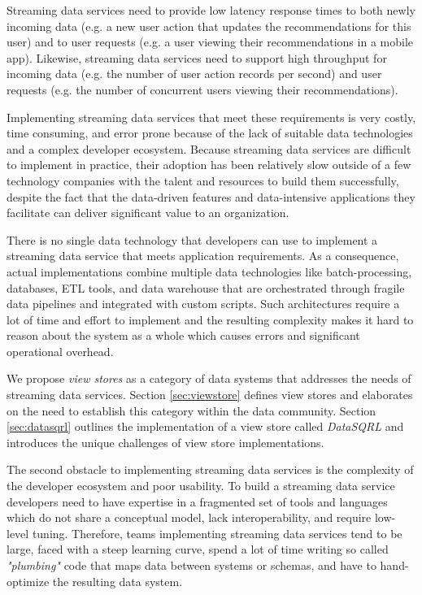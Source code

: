 \documentclass[	DIV=calc,%
							paper=letter,%
							fontsize=11pt,%
							twocolumn]{scrartcl}	 					%
\begin{document}
Streaming data services need to provide low latency response times to both newly incoming data (e.g. a new user action that updates the recommendations for this user) and to user requests (e.g. a user viewing their recommendations in a mobile app). Likewise, streaming data services need to support high throughput for incoming data (e.g. the number of user action records per second) and user requests (e.g. the number of concurrent users viewing their recommendations).

Implementing streaming data services that meet these requirements is very costly, time consuming, and error prone because of the lack of suitable data technologies and a complex developer ecosystem. Because streaming data services are difficult to implement in practice, their adoption has been relatively slow outside of a few technology companies with the talent and resources to build them successfully, despite the fact that the data-driven features and data-intensive applications they facilitate can deliver significant value to an organization.

There is no single data technology that developers can use to implement a streaming data service that meets application requirements. As a consequence, actual implementations combine multiple data technologies like batch-processing, databases, ETL tools, and data warehouse that are orchestrated through fragile data pipelines and integrated with custom scripts. Such architectures require a lot of time and effort to implement and the resulting complexity makes it hard to reason about the system as a whole which causes errors and significant operational overhead.

We propose \emph{view stores} as a category of data systems that addresses the needs of streaming data services. Section \ref{sec:viewstore} defines view stores and elaborates on the need to establish this category within the data community. Section \ref{sec:datasqrl} outlines the implementation of a view store called \emph{DataSQRL} and introduces the unique challenges of view store implementations.

The second obstacle to implementing streaming data services is the complexity of the developer ecosystem and poor usability. To build a streaming data service developers need to have expertise in a fragmented set of tools and languages which do not share a conceptual model, lack interoperability, and require low-level tuning. Therefore, teams implementing streaming data services tend to be large, faced with a steep learning curve, spend a lot of time writing so called \textit{"plumbing"} code that maps data between systems or schemas, and have to hand-optimize the resulting data system.
\end{document}
